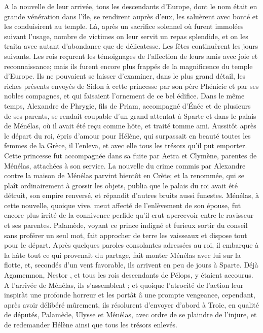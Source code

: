 \documentclass{article}
\begin{document}
A la nouvelle de leur arrivée, tons les descendants d'Europe, dont le nom était en grande vénération dans l'île, se rendirent auprès d'eux, les saluèrent avec bonté et les conduisirent au temple. Là, après un sacrifice solennel où furent immolées suivant l'usage, nombre de victimes on leur servit un repas splendide, et on les traita avec autant d'abondance que de délicatesse. Les fêtes continuèrent les jours suivants. Les rois reçurent les témoignages de l'affection de leurs amis avec joie et reconnaissance; mais ils furent encore plus frappés de la magnificence du temple d'Europe. Ils ne pouvaient se laisser d'examiner, dans le plus grand détail, les riches présents envoyés de Sidon à cette princesse par son père Phénicie et par ses nobles compagnes, et qui faisaient l'ornement de ce bel édifice.
 \pend
 \pstart
Dans le même temps, Alexandre de Phrygie, fils de Priam, accompagné d'Énée et de plusieurs de ses parents, se rendait coupable d'un grand attentat à Sparte et dans le palais de Ménélas, où il avait été reçu comme hôte, et traité tomme ami. Aussitôt après le départ du roi, épris d'amour pour Hélène, qui surpassait en beauté toutes les femmes de la Grèce, il l'enleva, et avec elle tous les trésors qu'il put emporter. Cette princesse fut accompagnée dans sa fuite par Aetra et Clymène, parentes de Ménélas, attachées à son service. La nouvelle du crime commis par Alexandre contre la maison de Ménélas parvint bientôt en Crète; et la renommée, qui se plaît ordinairement à grossir les objets, publia que le palais du roi avait été détruit, son empire renversé, et répandit d'autres bruits aussi funestes.
 \pend
 \pstart
Ménélas, à cette nouvelle, quoique vive. meut affecté de l'enlèvement de son épouse, fut encore plus irrité de la connivence perfide qu'il crut apercevoir entre le ravisseur et ses parentes. Palamède, voyant ce prince indigné et furieux sortir du conseil sans proférer un seul mot, fait approcher de terre les vaisseaux et dispose tout pour le départ. Après quelques paroles consolantes adressées au roi, il embarque à la hâte tout ce qui provenait du partage, fait monter Ménélas avec lui sur la flotte, et, secondés d'un vent favorable, ils arrivent en peu de jours à Sparte. Déjà Agamemnon, Nestor , et tous les rois descendants de Pélops, y étaient accourus. A l'arrivée de Ménélas, ils s'assemblent ; et quoique l'atrocité de l'action leur inspiràt une profonde horreur et les portât â une prompte vengeance, cependant, après avoir délibéré mûrement, ils résolurent d'envoyer d'abord à Troie, en qualité de députés, Palamède, Ulysse et Ménélas, avec ordre de se plaindre de l'injure, et de redemander Hélène ainsi que tous les trésors enlevés.
\pend
\endnumbering
\end{document}
